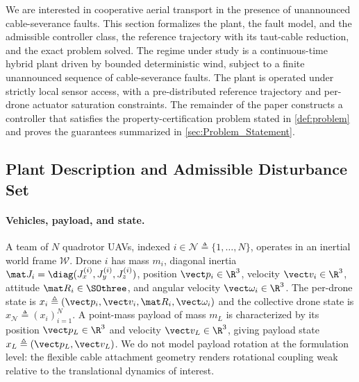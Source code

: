 
We are interested in cooperative aerial transport in the presence of unannounced cable-severance faults. This section formalizes the plant, the fault model, and the admissible controller class, the reference trajectory with its taut-cable reduction, and the exact problem solved. The regime under study is a continuous-time hybrid plant driven by bounded deterministic wind, subject to a finite unannounced sequence of cable-severance faults. The plant is operated under strictly local sensor access, with a pre-distributed reference trajectory and per-drone actuator saturation constraints. The remainder of the paper constructs a controller that satisfies the property-certification problem stated in \cref{def:problem} and proves the guarantees summarized in \cref{sec:Problem_Statement}.

\subsection{Plant Description and Admissible Disturbance Set}
\label{sec:plant}

\paragraph{Vehicles, payload, and state.} A team of $N$ quadrotor UAVs, indexed $i \in \mathcal{N} \triangleq \{1,\dots,N\}$, operates in an inertial world frame $\mathcal{W}$. Drone $i$ has mass $m_i$, diagonal inertia $\mat J_i = \diag(J_x^{(i)}, J_y^{(i)}, J_z^{(i)})$, position $\vect p_i \in \R^3$, velocity $\vect v_i \in \R^3$, attitude $\mat R_i \in \SOthree$, and angular velocity $\vect\omega_i \in \R^3$. The per-drone state is $x_i \triangleq (\vect p_i, \vect v_i, \mat R_i, \vect\omega_i)$ and the collective drone state is $x_{\mathcal{N}} \triangleq (x_i)_{i=1}^N$. A point-mass payload of mass $m_L$ is characterized by its position $\vect p_L \in \R^3$ and velocity $\vect v_L \in \R^3$, giving payload state $x_L \triangleq (\vect p_L, \vect v_L)$. We do not model payload rotation at the formulation level: the flexible cable attachment geometry renders rotational coupling weak relative to the
translational dynamics of interest.


